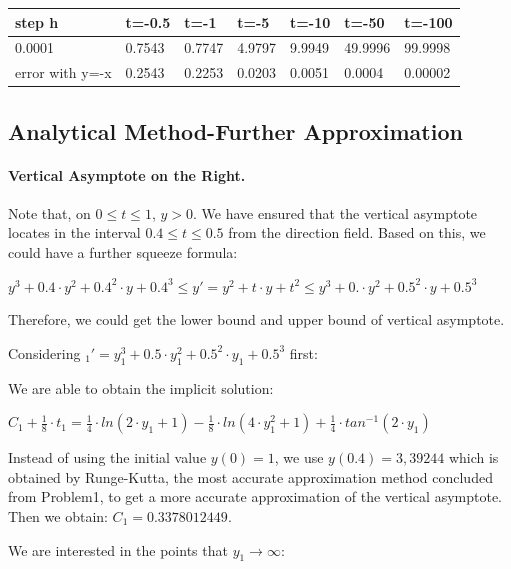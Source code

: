 \documentclass[11pt,a4paper]{article}
\begin{document}
\begin{table}[H]
	\centering
	\begin{tabular}{l|l|l|l|l|l|l}
		step h          & t=-0.5 & t=-1   & t=-5   & t=-10  & t=-50   & t=-100  \\ \hline
		0.0001          & 0.7543 & 0.7747 & 4.9797 & 9.9949 & 49.9996 & 99.9998 \\ \hline
		error with y=-x & 0.2543 & 0.2253 & 0.0203 & 0.0051 & 0.0004  & 0.00002 
	\end{tabular}
\end{table}

\subsection{Analytical Method-Further Approximation}
	\paragraph{Vertical Asymptote on the Right.} Note that, on $0 \leq t \leq 1$, $y > 0$. We have ensured that the vertical asymptote locates in the interval $0.4 \leq t \leq 0.5$ from the direction field. Based on this, we could have a further squeeze formula: 
	
	\begin{center}
		$y^3+0.4 \cdot y^2 + 0.4^2 \cdot y + 0.4^3 \leq y' = y^2+t \cdot y + t^2 \leq y^3 + 0. \cdot y^2 + 0.5^2 \cdot y + 0.5^3$
	\end{center}
	
	Therefore, we could get the lower bound and upper bound of vertical asymptote. 
	
	Considering $_1'=y_1^3+0.5 \cdot y_1^2 + 0.5^2 \cdot y_1 + 0.5^3$ first:
	
	We are able to obtain the implicit solution:
	
	\begin{center}
		$C_1+\frac{1}{8} \cdot t_1 = \frac{1}{4} \cdot ln(2 \cdot y_1+1)- \frac{1}{8}\cdot ln(4\cdot y_1^2+1)+\frac{1}{4}\cdot tan^{-1}(2 \cdot y_1)$
	\end{center}
	
	Instead of using the initial value $y(0)=1$, we use $y(0.4)=3,39244$ which is obtained by Runge-Kutta, the most accurate approximation method concluded from Problem1, to get a more accurate approximation of the vertical asymptote. Then we obtain: $C_1=0.3378012449$.
	
	We are interested in the points that $y_1 \rightarrow \infty$:
	
\end{document}
